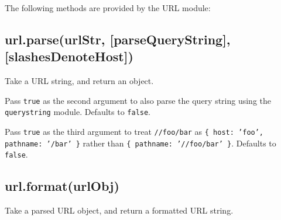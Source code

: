 The following methods are provided by the URL module:

\subsection{url.parse(urlStr, {[}parseQueryString{]},
{[}slashesDenoteHost{]})}\label{url.parseurlstr-parsequerystring-slashesdenotehost}

Take a URL string, and return an object.

Pass \texttt{true} as the second argument to also parse the query string
using the \texttt{querystring} module. Defaults to \texttt{false}.

Pass \texttt{true} as the third argument to treat \texttt{//foo/bar} as
\texttt{\{ host: 'foo', pathname: '/bar' \}} rather than
\texttt{\{ pathname: '//foo/bar' \}}. Defaults to \texttt{false}.

\subsection{url.format(urlObj)}\label{url.formaturlobj}

Take a parsed URL object, and return a formatted URL string.

